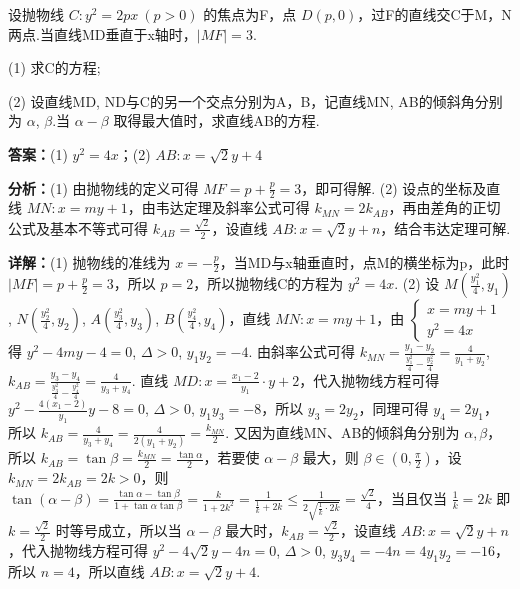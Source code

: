\begin{question}[points=12]
设抛物线 $C:y^2=2px\ (p>0)$ 的焦点为F，点 $D(p,0)$，过F的直线交C于M，N两点.当直线MD垂直于x轴时，$|MF|=3$.

(1) 求C的方程;

(2) 设直线MD, ND与C的另一个交点分别为A，B，记直线MN, AB的倾斜角分别为 $\alpha$, $\beta$.当 $\alpha-\beta$ 取得最大值时，求直线AB的方程.
\begin{solution}
\textbf{答案：}(1) $y^2=4x$；(2) $AB: x=\sqrt{2}y+4$

\textbf{分析：}(1) 由抛物线的定义可得 $MF=p+\frac{p}{2}=3$，即可得解. (2) 设点的坐标及直线 $MN: x=my+1$，由韦达定理及斜率公式可得 $k_{MN}=2k_{AB}$，再由差角的正切公式及基本不等式可得 $k_{AB}=\frac{\sqrt{2}}{2}$，设直线 $AB: x=\sqrt{2}y+n$，结合韦达定理可解.

\textbf{详解：}(1) 抛物线的准线为 $x=-\frac{p}{2}$，当MD与x轴垂直时，点M的横坐标为p，此时 $|MF|=p+\frac{p}{2}=3$，所以 $p=2$，所以抛物线C的方程为 $y^2=4x$.
(2) 设 $M(\frac{y_1^2}{4},y_1)$, $N(\frac{y_2^2}{4},y_2)$, $A(\frac{y_3^2}{4},y_3)$, $B(\frac{y_4^2}{4},y_4)$，直线 $MN:x=my+1$，由 $\begin{cases} x=my+1 \\ y^2=4x \end{cases}$ 得 $y^2-4my-4=0$, $\Delta>0$, $y_1y_2=-4$. 由斜率公式可得 $k_{MN}=\frac{y_1-y_2}{\frac{y_1^2}{4}-\frac{y_2^2}{4}}=\frac{4}{y_1+y_2}$, $k_{AB}=\frac{y_3-y_4}{\frac{y_3^2}{4}-\frac{y_4^2}{4}}=\frac{4}{y_3+y_4}$. 直线 $MD:x=\frac{x_1-2}{y_1}\cdot y+2$，代入抛物线方程可得 $y^2-\frac{4(x_1-2)}{y_1}y-8=0$, $\Delta>0$, $y_1y_3=-8$，所以 $y_3=2y_2$，同理可得 $y_4=2y_1$，所以 $k_{AB}=\frac{4}{y_3+y_4}=\frac{4}{2(y_1+y_2)}=\frac{k_{MN}}{2}$. 又因为直线MN、AB的倾斜角分别为 $\alpha,\beta$，所以 $k_{AB}=\tan\beta=\frac{k_{MN}}{2}=\frac{\tan\alpha}{2}$，若要使 $\alpha-\beta$ 最大，则 $\beta\in(0,\frac{\pi}{2})$，设 $k_{MN}=2k_{AB}=2k>0$，则 $\tan(\alpha-\beta)=\frac{\tan\alpha-\tan\beta}{1+\tan\alpha\tan\beta}=\frac{k}{1+2k^2}=\frac{1}{\frac{1}{k}+2k}\leq\frac{1}{2\sqrt{\frac{1}{k}\cdot2k}}=\frac{\sqrt{2}}{4}$，当且仅当 $\frac{1}{k}=2k$ 即 $k=\frac{\sqrt{2}}{2}$ 时等号成立，所以当 $\alpha-\beta$ 最大时，$k_{AB}=\frac{\sqrt{2}}{2}$，设直线 $AB: x=\sqrt{2}y+n$，代入抛物线方程可得 $y^2-4\sqrt{2}y-4n=0$, $\Delta>0$, $y_3y_4=-4n=4y_1y_2=-16$，所以 $n=4$，所以直线 $AB: x=\sqrt{2}y+4$.
\end{solution}
\end{question}

